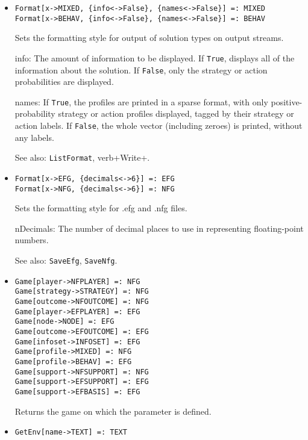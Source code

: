 \begin{itemize}
\item{}
\protect \large \begin{verbatim}
Format[x->MIXED, {info<->False}, {names<->False}] =: MIXED
Format[x->BEHAV, {info<->False}, {names<->False}] =: BEHAV
\end{verbatim} \normalsize

\bd
Sets the formatting style for output of solution types on output streams.
\bd
\item [info:] The amount of information to be displayed.  If \verb+True+,
displays all of the information about the solution.  If \verb+False+,
only the strategy or action probabilities are displayed.
\item [names:] If \verb+True+, the profiles are printed in a sparse format,
with only positive-probability strategy or action profiles displayed, tagged
by their strategy or action labels.  If \verb+False+, the whole vector
(including zeroes) is printed, without any labels.
\ed
\item [See also:] \verb+ListFormat+, verb+Write+.
\ed

\item{}
\protect \large \begin{verbatim}
Format[x->EFG, {decimals<->6}] =: EFG
Format[x->NFG, {decimals<->6}] =: NFG
\end{verbatim} \normalsize

\bd
Sets the formatting style for .efg and .nfg files.
\bd
\item [nDecimals:] The number of decimal places to use in representing
floating-point numbers.
\ed
\item [See also:] \verb+SaveEfg+, \verb+SaveNfg+.
\ed



\item{}
\protect \large \begin{verbatim}
Game[player->NFPLAYER] =: NFG 
Game[strategy->STRATEGY] =: NFG 
Game[outcome->NFOUTCOME] =: NFG 
Game[player->EFPLAYER] =: EFG 
Game[node->NODE] =: EFG 
Game[outcome->EFOUTCOME] =: EFG 
Game[infoset->INFOSET] =: EFG 
Game[profile->MIXED] =: NFG 
Game[profile->BEHAV] =: EFG 
Game[support->NFSUPPORT] =: NFG 
Game[support->EFSUPPORT] =: EFG 
Game[support->EFBASIS] =: EFG 
\end{verbatim} \normalsize

\bd
Returns the game on which the parameter is defined.
\ed

\item{}
\protect \large \begin{verbatim}
GetEnv[name->TEXT] =: TEXT 
\end{verbatim} \normalsize


\end{itemize}
